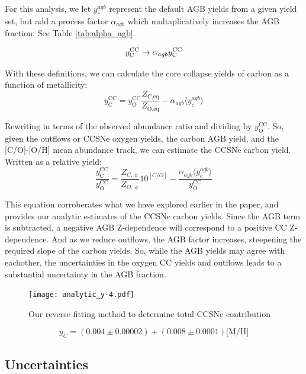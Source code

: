 \documentclass[fleqn,usenatbib]{mnras}
\begin{document}
For this analysis, we let $y_c^{agb}$ represent the default AGB yields from a given yield set, but add a process factor $\alpha_{agb}$ which multaplicatively increases the AGB fraction. See Table \ref{tab:alpha_agb}.

\begin{equation}
    y_{\rm C}^{\rm CC} \rightarrow \alpha_{agb}  y_{\rm C}^{\rm CC}
\end{equation}

With these definitions, we can calculate the core collapse yields of carbon as a function of metallicity:
\begin{equation}
    y_\text{C}^\text{CC} =  y_\text{O}^\text{CC} \frac{Z_\text{C,eq}}{Z_\text{O,eq}} - \alpha_{agb} \langle y_c^{agb} \rangle
\end{equation}

Rewriting in terms of the observed abundance ratio and dividing by $y_\text{O}^\text{CC}$. So, given the outflows or CCSNe oxygen yields, the carbon AGB yield, and the [C/O]-[O/H] mean abundance track, we can estimate the CCSNe carbon yield. Written as a relative yield:
\begin{equation}
    \frac{y_\text{C}^\text{CC}}{y_\text{O}^\text{CC}} = \frac{Z_{C, \sun}}{Z_{O, \sun}} 10^{[C/O]} - \frac{\alpha_{agb} \langle y_c^{agb} \rangle}{ y_\text{O}^\text{CC}}
\end{equation}

This equation corroberates what we have explored earlier in the paper, and provides our analytic estimates of the CCSNe carbon yields. Since the AGB term is subtracted, a negative AGB Z-dependence will correspond to a positive CC Z-dependence. And as we reduce outflows, the AGB factor increases, steepening the required slope of the carbon yields. So, while the AGB yields may agree with eachother, the uncertainties in the oxygen CC yields and outflows leads to a substantial uncertainty in the AGB fraction.  

\begin{figure}
    \centering
    \texttt{[image: analytic\_y-4.pdf]}
    \caption{Our reverse fitting method to determine total CCSNe contribution}
\end{figure}

\begin{equation}
    y_C = (0.004 \pm 0.00002) + (0.008 \pm 0.0001) \text{[M/H]} 
\end{equation}

\subsection{Uncertainties}
\end{document}
